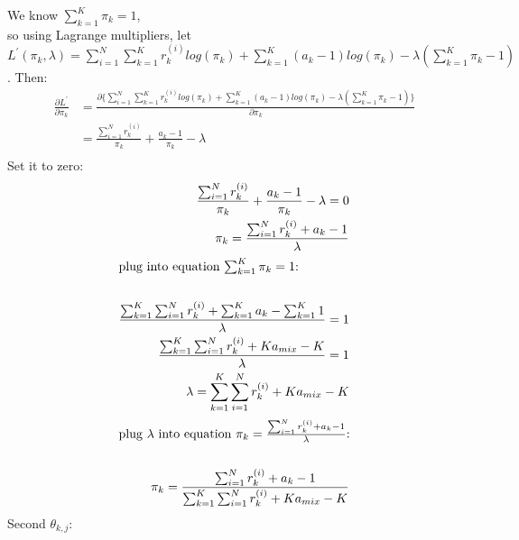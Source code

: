 \documentclass{article}
\begin{document}
We know $\sum_{k=1}^{K}\pi_k=1$,\\ so using Lagrange multipliers, let $L^\prime(\pi_k,\lambda) = \sum_{i = 1}^{N} \sum_{k = 1}^{K} r_k^{(i)}log(\pi_k)+\sum_{k=1}^{K}(a_k-1)log(\pi_k) - \lambda(\sum_{k=1}^{K}\pi_k-1)$. Then:
\begin{align*}
    \frac{\partial L^\prime}{\partial \pi_k} &= \frac{\partial \{\sum_{i = 1}^{N} \sum_{k = 1}^{K} r_k^{(i)}log(\pi_k)+\sum_{k=1}^{K}(a_k-1)log(\pi_k) - \lambda(\sum_{k=1}^{K}\pi_k-1) \}}{\partial \pi_k}\\
    &= \frac{\sum_{i = 1}^{N}r_k^{(i)}}{\pi_k}+\frac{a_k-1}{\pi_k}-\lambda\\
\end{align*}
Set it to zero:
\begin{align*}
    \frac{\sum_{i = 1}^{N}r_k^{(i)}}{\pi_k}+\frac{a_k-1}{\pi_k}-\lambda = 0\\
    \pi_k = \frac{\sum_{i = 1}^{N}r_k^{(i)}+a_k-1}{\lambda}\\
\intertext{plug into equation $\sum_{k=1}^{K}\pi_k=1$:}\\
    \frac{\sum_{k=1}^{K}\sum_{i = 1}^{N}r_k^{(i)}+\sum_{k=1}^{K}a_k-\sum_{k=1}^{K}1}{\lambda}=1\\
    \frac{\sum_{k=1}^{K}\sum_{i = 1}^{N}r_k^{(i)}+Ka_{mix}-K}{\lambda}=1\\
    \lambda = \sum_{k=1}^{K}\sum_{i = 1}^{N}r_k^{(i)}+Ka_{mix}-K\\
\intertext{plug $\lambda$ into equation $\pi_k = \frac{\sum_{i = 1}^{N}r_k^{(i)}+a_k-1}{\lambda}$:}\\
    \pi_k = \frac{\sum_{i = 1}^{N}r_k^{(i)}+a_k-1}{\sum_{k=1}^{K}\sum_{i = 1}^{N}r_k^{(i)}+Ka_{mix}-K}
\end{align*}
Second $\theta_{k,j}$:\\
\end{document}
